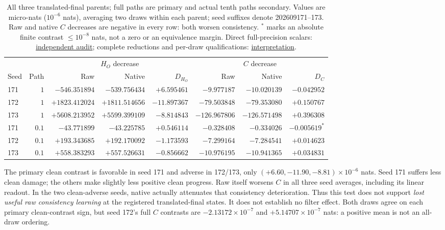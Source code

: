 \documentclass[10pt]{article}
\newcommand{\src}[2]{\href{../../../#1}{#2}}
\begin{document}
\begin{table}[!ht]
\centering\footnotesize
\setlength{\tabcolsep}{3pt}
\begin{tabular}{lrrrrrrr}\toprule
& & \multicolumn{3}{c}{$H_O$ decrease} & \multicolumn{3}{c}{$C$ decrease}\\
Seed & Path & Raw & Native & $D_{H_O}$ & Raw & Native & $D_C$\\\midrule
171 & $1$ & $-546.351894$ & $-539.756434$ & $+6.595461$ & $-9.977187$ & $-10.020139$ & $-0.042952$\\
172 & $1$ & $+1823.412024$ & $+1811.514656$ & $-11.897367$ & $-79.503848$ & $-79.353080$ & $+0.150767$\\
173 & $1$ & $+5608.213952$ & $+5599.399109$ & $-8.814843$ & $-126.967806$ & $-126.571498$ & $+0.396308$\\\midrule
171 & $0.1$ & $-43.771899$ & $-43.225785$ & $+0.546114$ & $-0.328408$ & $-0.334026$ & $-0.005619^{*}$\\
172 & $0.1$ & $+193.343685$ & $+192.170092$ & $-1.173593$ & $-7.299164$ & $-7.284541$ & $+0.014623$\\
173 & $0.1$ & $+558.383293$ & $+557.526631$ & $-0.856662$ & $-10.976195$ & $-10.941365$ & $+0.034831$\\\bottomrule
\end{tabular}
\caption{All three translated-final parents; full paths are primary and actual tenth paths secondary. Values are micro-nats ($10^{-6}$ nats), averaging two draws within each parent; seed suffixes denote 202609171--173. Raw and native $C$ decreases are negative in every row: both worsen consistency. $^{*}$ marks an absolute finite contrast $\leq10^{-8}$ nats, not a zero or an equivalence margin. Direct full-precision scalars: \src{output/2026-09-10-spectral-component-utility/audit.json}{independent audit}; complete reductions and per-draw qualifications: \src{output/2026-09-10-spectral-component-utility/interpretation-analysis.md}{interpretation}.}
\label{tab:component-utility}
\end{table}

The primary clean contrast is favorable in seed 171 and adverse in 172/173, only $(+6.60,-11.90,-8.81)\times10^{-6}$ nats. Seed 171 suffers less clean damage; the others make slightly less positive clean progress. Raw itself worsens $C$ in all three seed averages, including its linear readout. In the two clean-adverse seeds, native actually attenuates that consistency deterioration. Thus this test does not support \emph{lost useful raw consistency learning} at the registered translated-final states. It does not establish no filter effect. Both draws agree on each primary clean-contrast sign, but seed 172's full $C$ contrasts are $-2.13172\times10^{-7}$ and $+5.14707\times10^{-7}$ nats: a positive mean is not an all-draw ordering.
\end{document}
